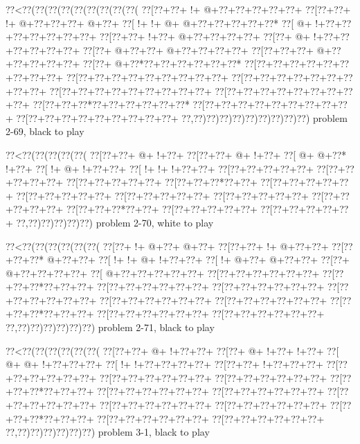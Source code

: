 \vbox{\vbox{\goo
\0??<\0??(\0??(\0??(\0??(\0??(\0??(\0??(\0??(\0??(
\0??[\0??+\0??+\- !+\- @+\0??+\0??+\0??+\0??+\0??+
\0??[\0??+\0??+\- !+\- @+\0??+\0??+\0??+\- @+\0??+
\0??[\- !+\- !+\- @+\- @+\0??+\0??+\0??+\0??+\0??*
\0??[\- @+\- !+\0??+\0??+\0??+\0??+\0??+\0??+\0??+
\0??[\0??+\0??+\- !+\0??+\- @+\0??+\0??+\0??+\0??+
\0??[\0??+\- @+\- !+\0??+\0??+\0??+\0??+\0??+\0??+
\0??[\0??+\- @+\0??+\0??+\- @+\0??+\0??+\0??+\0??+
\0??[\0??+\0??+\0??+\- @+\0??+\0??+\0??+\0??+\0??+
\0??[\0??+\- @+\0??*\0??+\0??+\0??+\0??+\0??+\0??*
\0??[\0??+\0??+\0??+\0??+\0??+\0??+\0??+\0??+\0??+
\0??[\0??+\0??+\0??+\0??+\0??+\0??+\0??+\0??+\0??+
\0??[\0??+\0??+\0??+\0??+\0??+\0??+\0??+\0??+\0??+
\0??[\0??+\0??+\0??+\0??+\0??+\0??+\0??+\0??+\0??+
\0??[\0??+\0??+\0??+\0??+\0??+\0??+\0??+\0??+\0??+
\0??[\0??+\0??+\0??*\0??+\0??+\0??+\0??+\0??+\0??*
\0??[\0??+\0??+\0??+\0??+\0??+\0??+\0??+\0??+\0??+
\0??[\0??+\0??+\0??+\0??+\0??+\0??+\0??+\0??+\0??+
\0??,\0??)\0??)\0??)\0??)\0??)\0??)\0??)\0??)\0??)
}
\hfil problem 2-69, black to play\hfil\break
}

\vbox{\vbox{\goo
\0??<\0??(\0??(\0??(\0??(\0??(
\0??[\0??+\0??+\- @+\- !+\0??+
\0??[\0??+\0??+\- @+\- !+\0??+
\0??[\- @+\- @+\0??*\- !+\0??+
\0??[\- !+\- @+\- !+\0??+\0??+
\0??[\- !+\- !+\- !+\0??+\0??+
\0??[\0??+\0??+\0??+\0??+\0??+
\0??[\0??+\0??+\0??+\0??+\0??+
\0??[\0??+\0??+\0??+\0??+\0??+
\0??[\0??+\0??+\0??*\0??+\0??+
\0??[\0??+\0??+\0??+\0??+\0??+
\0??[\0??+\0??+\0??+\0??+\0??+
\0??[\0??+\0??+\0??+\0??+\0??+
\0??[\0??+\0??+\0??+\0??+\0??+
\0??[\0??+\0??+\0??+\0??+\0??+
\0??[\0??+\0??+\0??*\0??+\0??+
\0??[\0??+\0??+\0??+\0??+\0??+
\0??[\0??+\0??+\0??+\0??+\0??+
\0??,\0??)\0??)\0??)\0??)\0??)
}
\hfil problem 2-70, white to play\hfil\break
}

\vbox{\vbox{\goo
\0??<\0??(\0??(\0??(\0??(\0??(\0??(
\0??[\0??+\- !+\- @+\0??+\- @+\0??+
\0??[\0??+\0??+\- !+\- @+\0??+\0??+
\0??[\0??+\0??+\0??*\- @+\0??+\0??+
\0??[\- !+\- !+\- @+\- !+\0??+\0??+
\0??[\- !+\- @+\0??+\- @+\0??+\0??+
\0??[\0??+\- @+\0??+\0??+\0??+\0??+
\0??[\- @+\0??+\0??+\0??+\0??+\0??+
\0??[\0??+\0??+\0??+\0??+\0??+\0??+
\0??[\0??+\0??+\0??*\0??+\0??+\0??+
\0??[\0??+\0??+\0??+\0??+\0??+\0??+
\0??[\0??+\0??+\0??+\0??+\0??+\0??+
\0??[\0??+\0??+\0??+\0??+\0??+\0??+
\0??[\0??+\0??+\0??+\0??+\0??+\0??+
\0??[\0??+\0??+\0??+\0??+\0??+\0??+
\0??[\0??+\0??+\0??*\0??+\0??+\0??+
\0??[\0??+\0??+\0??+\0??+\0??+\0??+
\0??[\0??+\0??+\0??+\0??+\0??+\0??+
\0??,\0??)\0??)\0??)\0??)\0??)\0??)
}
\hfil problem 2-71, black to play\hfil\break
}

\vbox{\vbox{\goo
\0??<\0??(\0??(\0??(\0??(\0??(\0??(
\0??[\0??+\0??+\- @+\- !+\0??+\0??+
\0??[\0??+\- @+\- !+\0??+\- !+\0??+
\0??[\- @+\- @+\- !+\0??+\0??+\0??+
\0??[\- !+\- !+\0??+\0??+\0??+\0??+
\0??[\0??+\0??+\- !+\0??+\0??+\0??+
\0??[\0??+\0??+\0??+\0??+\0??+\0??+
\0??[\0??+\0??+\0??+\0??+\0??+\0??+
\0??[\0??+\0??+\0??+\0??+\0??+\0??+
\0??[\0??+\0??+\0??*\0??+\0??+\0??+
\0??[\0??+\0??+\0??+\0??+\0??+\0??+
\0??[\0??+\0??+\0??+\0??+\0??+\0??+
\0??[\0??+\0??+\0??+\0??+\0??+\0??+
\0??[\0??+\0??+\0??+\0??+\0??+\0??+
\0??[\0??+\0??+\0??+\0??+\0??+\0??+
\0??[\0??+\0??+\0??*\0??+\0??+\0??+
\0??[\0??+\0??+\0??+\0??+\0??+\0??+
\0??[\0??+\0??+\0??+\0??+\0??+\0??+
\0??,\0??)\0??)\0??)\0??)\0??)\0??)
}
\hfil problem 3-1, black to play\hfil\break
}

